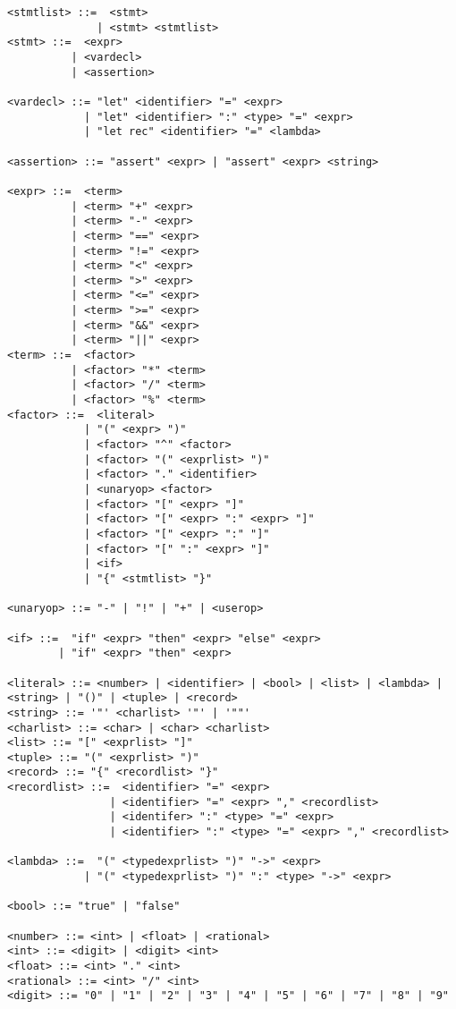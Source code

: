 \begin{verbatim}
<stmtlist> ::=  <stmt> 
              | <stmt> <stmtlist>
<stmt> ::=  <expr> 
          | <vardecl>
          | <assertion>
          
<vardecl> ::= "let" <identifier> "=" <expr>
            | "let" <identifier> ":" <type> "=" <expr>
            | "let rec" <identifier> "=" <lambda>
            
<assertion> ::= "assert" <expr> | "assert" <expr> <string>

<expr> ::=  <term> 
          | <term> "+" <expr> 
          | <term> "-" <expr>
          | <term> "==" <expr>
          | <term> "!=" <expr>
          | <term> "<" <expr>
          | <term> ">" <expr>
          | <term> "<=" <expr>
          | <term> ">=" <expr>
          | <term> "&&" <expr>
          | <term> "||" <expr>
<term> ::=  <factor> 
          | <factor> "*" <term> 
          | <factor> "/" <term> 
          | <factor> "%" <term> 
<factor> ::=  <literal> 
            | "(" <expr> ")" 
            | <factor> "^" <factor>
            | <factor> "(" <exprlist> ")"
            | <factor> "." <identifier>
            | <unaryop> <factor>
            | <factor> "[" <expr> "]"
            | <factor> "[" <expr> ":" <expr> "]"
            | <factor> "[" <expr> ":" "]"
            | <factor> "[" ":" <expr> "]"
            | <if>
            | "{" <stmtlist> "}"

<unaryop> ::= "-" | "!" | "+" | <userop>

<if> ::=  "if" <expr> "then" <expr> "else" <expr>
        | "if" <expr> "then" <expr>

<literal> ::= <number> | <identifier> | <bool> | <list> | <lambda> | <string> | "()" | <tuple> | <record>
<string> ::= '"' <charlist> '"' | '""'
<charlist> ::= <char> | <char> <charlist>
<list> ::= "[" <exprlist> "]"
<tuple> ::= "(" <exprlist> ")"
<record> ::= "{" <recordlist> "}"
<recordlist> ::=  <identifier> "=" <expr> 
                | <identifier> "=" <expr> "," <recordlist>
                | <identifer> ":" <type> "=" <expr> 
                | <identifier> ":" <type> "=" <expr> "," <recordlist>
            
<lambda> ::=  "(" <typedexprlist> ")" "->" <expr>
            | "(" <typedexprlist> ")" ":" <type> "->" <expr>

<bool> ::= "true" | "false"
            
<number> ::= <int> | <float> | <rational>
<int> ::= <digit> | <digit> <int>
<float> ::= <int> "." <int>
<rational> ::= <int> "/" <int>
<digit> ::= "0" | "1" | "2" | "3" | "4" | "5" | "6" | "7" | "8" | "9"


\end{verbatim}
